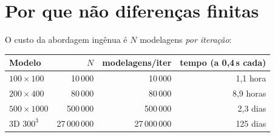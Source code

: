 \documentclass[11pt,a4paper,oneside]{report}
\begin{document}
\section{Por que n\~ao diferen\c{c}as finitas}
\label{sec:forcabruta}

O custo da abordagem ing\^enua \'e $N$ modelagens \emph{por itera\c{c}\~ao}:

\begin{center}
\begin{tabular}{@{}lrrr@{}}
\toprule
\textbf{Modelo} & $N$ & \textbf{modelagens/iter} & \textbf{tempo (a 0{,}4\,s cada)} \\
\midrule
$100\times100$   & 10\,000      & 10\,000      & 1{,}1 hora \\
$200\times400$   & 80\,000      & 80\,000      & 8{,}9 horas \\
$500\times1000$  & 500\,000     & 500\,000     & 2{,}3 dias \\
3D $300^{3}$     & 27\,000\,000 & 27\,000\,000 & 125 dias \\
\bottomrule
\end{tabular}
\end{center}
\end{document}
